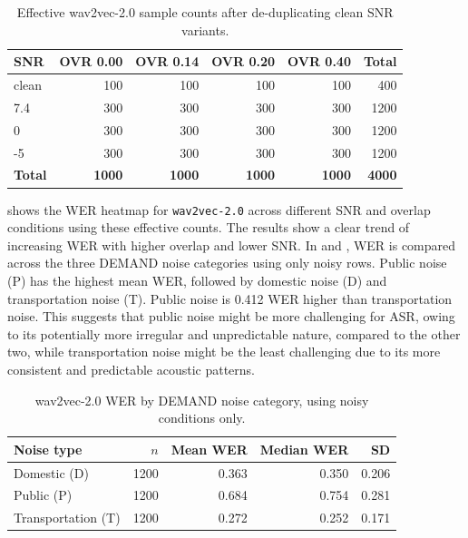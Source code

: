 \begin{table}[htbp]
\centering
\caption{Effective wav2vec-2.0 sample counts after de-duplicating clean SNR variants.}
\label{tab:wav2vec2_effective_scope_counts}
\begin{tabular}{lrrrrr}
\toprule
\textbf{SNR} & \textbf{OVR 0.00} & \textbf{OVR 0.14} & \textbf{OVR 0.20} & \textbf{OVR 0.40} & \textbf{Total} \\
\midrule
clean & 100 & 100 & 100 & 100 & 400 \\
7.4 & 300 & 300 & 300 & 300 & 1200 \\
0 & 300 & 300 & 300 & 300 & 1200 \\
-5 & 300 & 300 & 300 & 300 & 1200 \\
\midrule
\textbf{Total} & \textbf{1000} & \textbf{1000} & \textbf{1000} & \textbf{1000} & \textbf{4000} \\
\bottomrule
\end{tabular}
\end{table}

 shows the WER heatmap for \texttt{wav2vec-2.0} across different SNR and overlap conditions using these effective counts. The results show a clear trend of increasing WER with higher overlap and lower SNR. In  and , WER is compared across the three DEMAND noise categories using only noisy rows. Public noise (P) has the highest mean WER, followed by domestic noise (D) and transportation noise (T). Public noise is 0.412 WER higher than transportation noise. This suggests that public noise might be more challenging for ASR, owing to its potentially more irregular and unpredictable nature, compared to the other two, while transportation noise might be the least challenging due to its more consistent and predictable acoustic patterns. 

\begin{table}[htbp]
\centering
\caption{wav2vec-2.0 WER by DEMAND noise category, using noisy conditions only.}
\label{tab:wav2vec2_noise_type_wer}
\begin{tabular}{lrrrr}
\toprule
\textbf{Noise type} & \textbf{$n$} & \textbf{Mean WER} & \textbf{Median WER} & \textbf{SD} \\
\midrule
Domestic (D) & 1200 & 0.363 & 0.350 & 0.206 \\
Public (P) & 1200 & 0.684 & 0.754 & 0.281 \\
Transportation (T) & 1200 & 0.272 & 0.252 & 0.171 \\
\bottomrule
\end{tabular}
\end{table}

